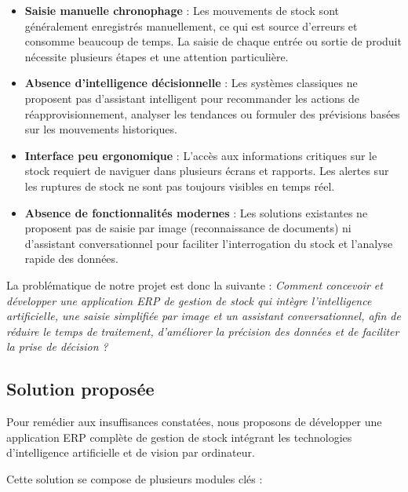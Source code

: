 \begin{itemize}[label=—]
    \item \textbf{Saisie manuelle chronophage} : Les mouvements de stock sont généralement enregistrés manuellement, ce qui est source d'erreurs et consomme beaucoup de temps. La saisie de chaque entrée ou sortie de produit nécessite plusieurs étapes et une attention particulière.

    \item \textbf{Absence d'intelligence décisionnelle} : Les systèmes classiques ne proposent pas d'assistant intelligent pour recommander les actions de réapprovisionnement, analyser les tendances ou formuler des prévisions basées sur les mouvements historiques.

    \item \textbf{Interface peu ergonomique} : L'accès aux informations critiques sur le stock requiert de naviguer dans plusieurs écrans et rapports. Les alertes sur les ruptures de stock ne sont pas toujours visibles en temps réel.

    \item \textbf{Absence de fonctionnalités modernes} : Les solutions existantes ne proposent pas de saisie par image (reconnaissance de documents) ni d'assistant conversationnel pour faciliter l'interrogation du stock et l'analyse rapide des données.
\end{itemize}

La problématique de notre projet est donc la suivante : \textit{Comment concevoir et développer une application ERP de gestion de stock qui intègre l'intelligence artificielle, une saisie simplifiée par image et un assistant conversationnel, afin de réduire le temps de traitement, d'améliorer la précision des données et de faciliter la prise de décision ?}

\subsection{Solution proposée}

Pour remédier aux insuffisances constatées, nous proposons de développer une application ERP complète de gestion de stock intégrant les technologies d'intelligence artificielle et de vision par ordinateur.

Cette solution se compose de plusieurs modules clés :

